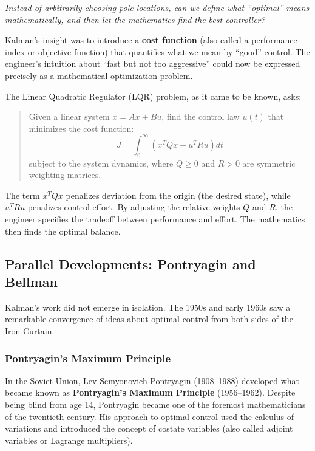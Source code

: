 \textit{Instead of arbitrarily choosing pole locations, can we define what ``optimal'' means mathematically, and then let the mathematics find the best controller?}

Kalman's insight was to introduce a \textbf{cost function} (also called a performance index or objective function) that quantifies what we mean by ``good'' control. The engineer's intuition about ``fast but not too aggressive'' could now be expressed precisely as a mathematical optimization problem.

The Linear Quadratic Regulator (LQR) problem, as it came to be known, asks:
\begin{quote}
Given a linear system $\dot{x} = Ax + Bu$, find the control law $u(t)$ that minimizes the cost function:
\begin{equation}
J = \int_0^\infty \left( x^T Q x + u^T R u \right) dt
\end{equation}
subject to the system dynamics, where $Q \geq 0$ and $R > 0$ are symmetric weighting matrices.
\end{quote}

The term $x^T Q x$ penalizes deviation from the origin (the desired state), while $u^T R u$ penalizes control effort. By adjusting the relative weights $Q$ and $R$, the engineer specifies the tradeoff between performance and effort. The mathematics then finds the optimal balance.

\subsection{Parallel Developments: Pontryagin and Bellman}

Kalman's work did not emerge in isolation. The 1950s and early 1960s saw a remarkable convergence of ideas about optimal control from both sides of the Iron Curtain.

\subsubsection{Pontryagin's Maximum Principle}

In the Soviet Union, Lev Semyonovich Pontryagin (1908--1988) developed what became known as \textbf{Pontryagin's Maximum Principle} (1956--1962). Despite being blind from age 14, Pontryagin became one of the foremost mathematicians of the twentieth century. His approach to optimal control used the calculus of variations and introduced the concept of costate variables (also called adjoint variables or Lagrange multipliers).

